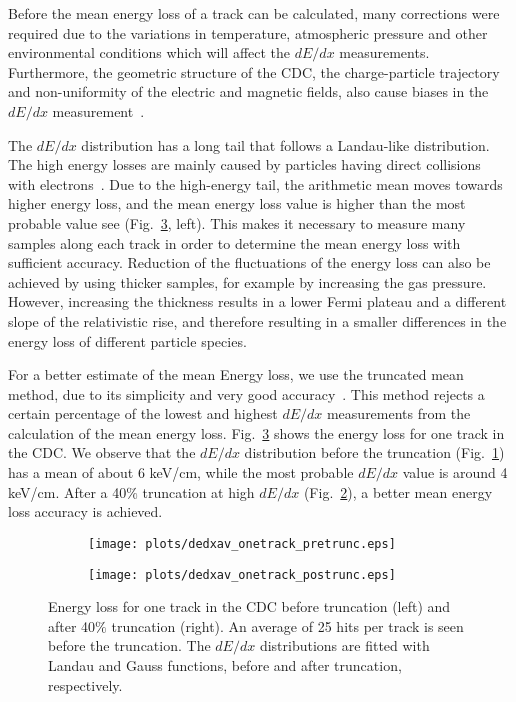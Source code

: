 Before the mean energy loss of a track can be calculated, many corrections were required due to the variations in temperature, atmospheric pressure and other environmental conditions which will affect the $dE/dx$ measurements. Furthermore, the geometric structure of the CDC, the charge-particle trajectory and non-uniformity of the electric and magnetic fields, also cause biases in the $dE/dx$ measurement~\cite{Blum08,Cao10,Hauschild96}.
~\par The $dE/dx$ distribution has a long tail that follows a Landau-like distribution. The high energy losses are mainly caused by particles having direct collisions with electrons~\cite{Leo94}. Due to the high-energy tail, the arithmetic mean moves towards higher energy loss, and the mean energy loss value is higher than the most probable value see (Fig.~\ref{fig.3.3}, left). This makes it necessary to measure many samples along each track in order to determine the mean energy loss with sufficient accuracy. Reduction of the fluctuations of the energy loss can also be achieved by using thicker samples, for example by increasing the gas pressure. However, increasing the thickness results in a lower Fermi plateau and a different slope of the relativistic rise, and therefore resulting in a smaller differences in the energy loss of different particle species.
~\par For a better estimate of the mean Energy loss, we use the truncated mean method, due to its simplicity and very good accuracy~\cite{Blum08,Cao10,Hauschild96}. This method rejects a certain percentage of the lowest and highest $dE/dx$ measurements from the calculation of the mean energy loss. Fig.~\ref{fig.3.3} shows the energy loss for one track in the CDC. We observe that the $dE/dx$ distribution before the truncation (Fig.~\ref{fig.3.3.a}) has a mean of about 6 keV/cm, while the most probable $dE/dx$ value is around 4 keV/cm. After a 40$\%$ truncation at high $dE/dx$ (Fig.~\ref{fig.3.3.b}), a better mean energy loss accuracy is achieved.

\begin{figure}[H]
    \centering
    \begin{subfigure}[b]{0.5\textwidth}
        \texttt{[image: plots/dedxav\_onetrack\_pretrunc.eps]}
        \caption{}
        \label{fig.3.3.a}        
    \end{subfigure}\hfill
    \begin{subfigure}[b]{0.5\textwidth}
        \texttt{[image: plots/dedxav\_onetrack\_postrunc.eps]}
        \caption{}
        \label{fig.3.3.b}        
    \end{subfigure}
    \caption{Energy loss for one track in the CDC before truncation (left) and after 40$\%$ truncation (right). An average of 25 hits per track is seen before the truncation. The $dE/dx$ distributions are fitted with Landau and Gauss functions, before and after truncation, respectively.}
    \label{fig.3.3}
\end{figure}
\vfill

